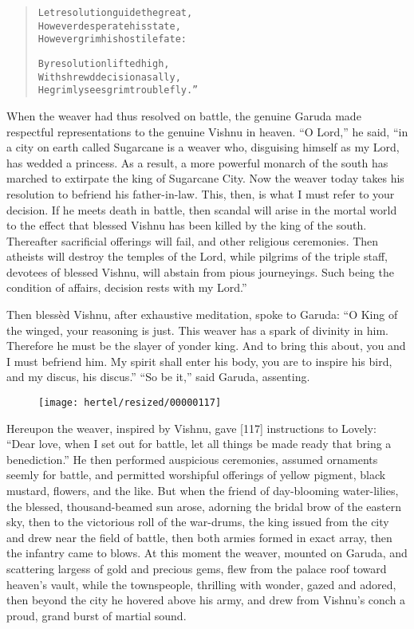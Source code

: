 \documentclass[article, twoside, 10pt]{memoir}
\renewenvironment{verbatim}{%
\begin{quote}%
\vskip -10pt%
\begin{alltt}\normalfont\small}{\end{alltt}%
\end{quote}%
\vskip -10pt
} %
\begin{document}
\begin{verbatim}
Let resolution guide the great,
However desperate his state,
However grim his hostile fate:

By resolution lifted high,
With shrewd decision as ally,
He grimly sees grim trouble fly.”
\end{verbatim}
When the weaver had thus resolved on battle, the genuine Garuda
made respectful representations to the genuine Vishnu in heaven.
``O Lord,'' he said,
``in a city on earth called Sugarcane is a weaver who, disguising himself as my Lord, has wedded a princess. As a result, a more powerful monarch of the south has marched to extirpate the king of Sugarcane City. Now the weaver today takes his resolution to befriend his father-in-law. This, then, is what I must refer to your decision. If he meets death in battle, then scandal will arise in the mortal world to the effect that blessed Vishnu has been killed by the king of the south. Thereafter sacrificial offerings will fail, and other religious ceremonies. Then atheists will destroy the temples of the Lord, while pilgrims of the triple staff, devotees of blessed Vishnu, will abstain from pious journeyings. Such being the condition of affairs, decision rests with my Lord.''

Then blessèd Vishnu, after exhaustive meditation, spoke to Garuda:
``O King of the winged, your reasoning is just. This weaver has a spark of divinity in him. Therefore he must be the slayer of yonder king. And to bring this about, you and I must befriend him. My spirit shall enter his body, you are to inspire his bird, and my discus, his discus.''
``So be it,'' said Garuda, assenting.

\begin{figure}[p]\texttt{[image: hertel/resized/00000117]}\end{figure}Hereupon the weaver, inspired by Vishnu, gave [117] instructions to
Lovely:
``Dear love, when I set out for battle, let all things be made ready that bring a benediction.''
He then performed auspicious ceremonies, assumed ornaments seemly
for battle, and permitted worshipful offerings of yellow pigment,
black mustard, flowers, and the like. But when the friend of
day-blooming water-lilies, the blessed, thousand-beamed sun arose,
adorning the bridal brow of the eastern sky, then to the victorious
roll of the war-drums, the king issued from the city and drew near
the field of battle, then both armies formed in exact array, then
the infantry came to blows. At this moment the weaver, mounted on
Garuda, and scattering largess of gold and precious gems, flew from
the palace roof toward heaven's vault, while the townspeople,
thrilling with wonder, gazed and adored, then beyond the city he
hovered above his army, and drew from Vishnu's conch a proud, grand
burst of martial sound.
\end{document}
